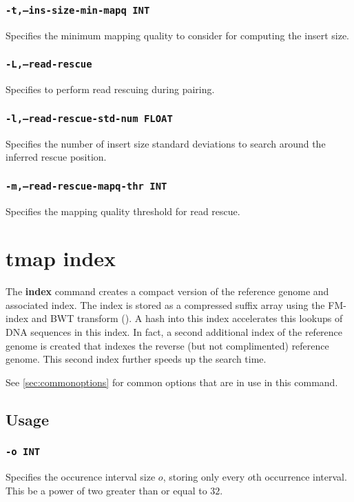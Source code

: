 \documentclass[a4paper,12pt]{book}
\newcommand{\TT}[1]{{\tt #1}} %
\newcommand{\BF}[1]{{\bf #1}} %
\begin{document}
\subsubsection{\TT{-t,--ins-size-min-mapq INT}}
Specifies the minimum mapping quality to consider for computing the insert size.

\subsubsection{\TT{-L,--read-rescue}}
Specifies to perform read rescuing during pairing.

\subsubsection{\TT{-l,--read-rescue-std-num FLOAT}}
Specifies the number of insert size standard deviations to search around the inferred rescue position.

\subsubsection{\TT{-m,--read-rescue-mapq-thr INT}}
Specifies the mapping quality threshold for read rescue.

\section{tmap index}
\label{sec:index}
The \BF{index} command creates a compact version of the reference genome and associated index.
The index is stored as a compressed suffix array using the FM-index and BWT transform (\cite{FM-index,BWT}).
A hash into this index accelerates this lookups of DNA sequences in this index.
In fact, a second additional index of the reference genome is created that indexes the reverse (but not complimented) reference genome.
This second index further speeds up the search time.

See \autoref{sec:commonoptions} for common options that are in use in this command.

\subsection{Usage}

\subsubsection{\TT{-o INT}}
Specifies the occurence interval size $o$, storing only every $o$th occurrence interval.
This be a power of two greater than or equal to $32$.
\end{document}
